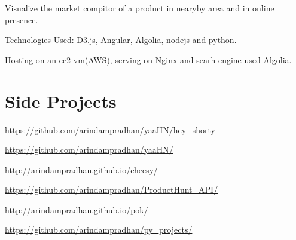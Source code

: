 \documentclass[]{deedy-resume-openfont}
\begin{document}
\begin{minipage}[t]{0.66\textwidth}
\vspace{\topsep} %
\begin{tightemize}
\item Visualize the market compitor of a product in nearyby area and in online presence.
\item Technologies Used: D3.js, Angular, Algolia, nodejs and python.
\item Hosting on an ec2 vm(AWS), serving on Nginx and searh engine used Algolia.
\vspace{\topsep} %
\end{tightemize}



\section{Side Projects}

{ \url{https://github.com/arindampradhan/yaaHN/hey_shorty} }\\
\sectionsep

{ \url{https://github.com/arindampradhan/yaaHN/} }\\
\sectionsep

{ \url{http://arindampradhan.github.io/cheesy/} }\\
\sectionsep

{ \url{https://github.com/arindampradhan/ProductHunt_API/} }\\
\sectionsep

{ \url{http://arindampradhan.github.io/pok/} }\\
\sectionsep

{ \url{https://github.com/arindampradhan/py_projects/} }\\
\sectionsep



\end{minipage}
\end{document}
